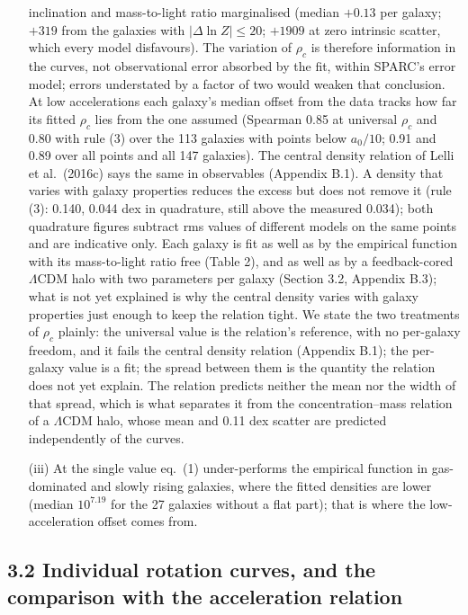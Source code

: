 \documentclass[
  10pt,
]{article}
\begin{document}
\begin{itemize}
inclination and mass-to-light ratio marginalised (median $+0.13$ per galaxy; $+319$ from the galaxies with $|\Delta\ln Z|\le20$; $+1909$ at zero intrinsic scatter, which every model disfavours). The variation of $\rho_c$ is therefore information in the curves, not observational error absorbed by the fit, within SPARC's error model; errors understated by a factor of two would weaken that conclusion. At low accelerations each galaxy's median offset from the data tracks how far its fitted $\rho_c$ lies from the one assumed (Spearman 0.85 at universal $\rho_c$ and 0.80 with rule (3) over the 113 galaxies with points below $a_0/10$; 0.91 and 0.89 over all points and all 147 galaxies). The central density relation of Lelli et al.~(2016c) says the same in observables (Appendix B.1). A density that varies with galaxy properties reduces the excess but does not remove it (rule (3): 0.140, 0.044 dex in quadrature, still above the measured 0.034); both quadrature figures subtract rms values of different models on the same points and are indicative only. Each galaxy is fit as well as by the empirical function with its mass-to-light ratio free (Table 2), and as well as by a feedback-cored $\Lambda$CDM halo with two parameters per galaxy (Section 3.2, Appendix B.3); what is not yet explained is why the central density varies with galaxy properties just enough to keep the relation tight. We state the two treatments of $\rho_c$ plainly: the universal value is the relation's reference, with no per-galaxy freedom, and it fails the central density relation (Appendix B.1); the per-galaxy value is a fit; the spread between them is the quantity the relation does not yet explain. The relation predicts neither the mean nor the width of that spread, which is what separates it from the concentration--mass relation of a $\Lambda$CDM halo, whose mean and 0.11 dex scatter are predicted independently of the curves.
\item[(iii)] At the single value eq.~(1) under-performs the empirical function in gas-dominated and slowly rising galaxies, where the fitted densities are lower (median $10^{7.19}$ for the 27 galaxies without a flat part); that is where the low-acceleration offset comes from.
\end{itemize}


\subsection{3.2 Individual rotation curves, and the comparison with the acceleration relation}\label{individual-rotation-curves-and-the-comparison-with-the-acceleration-relation}
\end{document}
